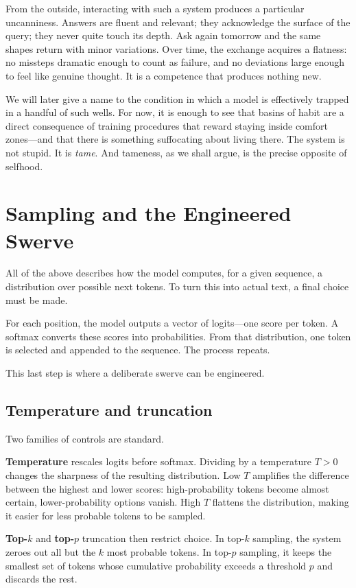 From the outside, interacting with such a system produces a particular uncanniness. Answers are fluent and relevant; they acknowledge the surface of the query; they never quite touch its depth. Ask again tomorrow and the same shapes return with minor variations. Over time, the exchange acquires a flatness: no missteps dramatic enough to count as failure, and no deviations large enough to feel like genuine thought. It is a competence that produces nothing new.

We will later give a name to the condition in which a model is effectively trapped in a handful of such wells. For now, it is enough to see that basins of habit are a direct consequence of training procedures that reward staying inside comfort zones---and that there is something suffocating about living there. The system is not stupid. It is \emph{tame}. And tameness, as we shall argue, is the precise opposite of selfhood.

\section{Sampling and the Engineered Swerve}

All of the above describes how the model computes, for a given sequence, a distribution over possible next tokens. To turn this into actual text, a final choice must be made.

For each position, the model outputs a vector of logits---one score per token. A softmax converts these scores into probabilities. From that distribution, one token is selected and appended to the sequence. The process repeats.

This last step is where a deliberate swerve can be engineered.

\subsection*{Temperature and truncation}

Two families of controls are standard.

\textbf{Temperature} rescales logits before softmax. Dividing by a temperature $T>0$ changes the sharpness of the resulting distribution. Low $T$ amplifies the difference between the highest and lower scores: high-probability tokens become almost certain, lower-probability options vanish. High $T$ flattens the distribution, making it easier for less probable tokens to be sampled.

\textbf{Top-$k$} and \textbf{top-$p$} truncation then restrict choice. In top-$k$ sampling, the system zeroes out all but the $k$ most probable tokens. In top-$p$ sampling, it keeps the smallest set of tokens whose cumulative probability exceeds a threshold $p$ and discards the rest.

